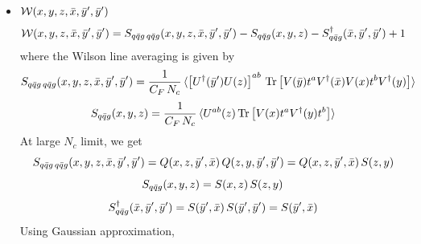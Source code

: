 \documentclass[9pt]{article}
\numberwithin{equation}{section}
\begin{document}
\begin{itemize}
\begin{align}
        \mathcal{W}(x',y,x',\Bar{x},\Bar{y},\Bar{z}) & = S_{q\Bar{q}g\,q\Bar{q}g}(x',y,x',\Bar{x},\Bar{y},\Bar{z}) -S_{q\Bar{q}g}(x',y,x') - S^{\dagger}_{q\Bar{q}g}(\Bar{x},\Bar{y},\Bar{z}) + 1
    \end{align}
where the Wilson line averaging is given by 
$$S_{q\Bar{q}g\,q\Bar{q}g}(x',y,x',\Bar{x},\Bar{y},\Bar{z}) =  \frac{1}{C_{F}\,N_{c}}\, \langle \left[U^{\dagger}(\Bar{z})U(x')\right]^{ab}\, \text{Tr}\left[V(\Bar{y})t^{a}V^{\dagger}(\Bar{x})V(x')t^{b}V^{\dagger}(y)\right] \rangle$$
$$S_{q\Bar{q}g}(x',y,x') =  \frac{1}{C_{F}\,N_{c}}\, \langle U^{ab}(x')\,\text{Tr}\left[V(x')t^{a}V^{\dagger}(y)t^{b}\right]\rangle$$
At large $N_{c}$ limit, we get
$$S_{q\Bar{q}g\,q\Bar{q}g}(x',y,x',\Bar{x},\Bar{y},\Bar{z}) = Q(x',x',\Bar{z},\Bar{x})\, Q(x',y,\Bar{y},\Bar{z}) = S(\Bar{z},\Bar{x})\,Q(x',y,\Bar{y},\Bar{z})$$
$$S_{q\Bar{q}g}(x',y,x') = S(x',x')\, S(x',y) = S(x',y) $$
$$S^{\dagger}_{q\Bar{q}g}(\Bar{x},\Bar{y},\Bar{z}) = S(\Bar{z},\Bar{x})\, S(\Bar{y},\Bar{z})$$
Using Gaussian approximation,
\begin{align}
    Q(x',y,\Bar{y},\Bar{z}) & = S(x',y)\,S(\Bar{y},\Bar{z}) - \frac{F(x',y;\Bar{y},\Bar{z})}{F(x',\Bar{y};y,\Bar{z})}\,\left[S(x',y)\,S(\Bar{y},\Bar{z})-S(x',\Bar{z})\,S(\Bar{y},y)\right]
\end{align}
\item $\mathcal{W}(x,y,z,\Bar{x},\Bar{y}',\Bar{y}')$
\begin{align}
        \mathcal{W}(x,y,z,\Bar{x},\Bar{y}',\Bar{y}') & = S_{q\Bar{q}g\,q\Bar{q}g}(x,y,z,\Bar{x},\Bar{y}',\Bar{y}') -S_{q\Bar{q}g}(x,y,z) - S^{\dagger}_{q\Bar{q}g}(\Bar{x},\Bar{y}',\Bar{y}') + 1
    \end{align}
where the Wilson line averaging is given by 
$$S_{q\Bar{q}g\,q\Bar{q}g}(x,y,z,\Bar{x},\Bar{y}',\Bar{y}') = \frac{1}{C_{F}\,N_{c}}\, \langle \left[U^{\dagger}(\Bar{y}')U(z)\right]^{ab}\, \text{Tr}\left[V(\Bar{y})t^{a}V^{\dagger}(\Bar{x})V(x)t^{b}V^{\dagger}(y)\right] \rangle$$
$$S_{q\Bar{q}g}(x,y,z) =  \frac{1}{C_{F}\,N_{c}}\, \langle U^{ab}(z)\,\text{Tr}\left[V(x)t^{a}V^{\dagger}(y)t^{b}\right]\rangle$$
At large $N_{c}$ limit, we get
$$S_{q\Bar{q}g\,q\Bar{q}g}(x,y,z,\Bar{x},\Bar{y}',\Bar{y}') = Q(x,z,\Bar{y}',\Bar{x})\, Q(z,y,\Bar{y}',\Bar{y}') = Q(x,z,\Bar{y}',\Bar{x})\, S(z,y) $$
$$S_{q\Bar{q}g}(x,y,z) = S(x,z)\, S(z,y)$$
$$S^{\dagger}_{q\Bar{q}g}(\Bar{x},\Bar{y}',\Bar{y}') = S(\Bar{y}',\Bar{x})\, S(\Bar{y}',\Bar{y}') = S(\Bar{y}',\Bar{x})$$
Using Gaussian approximation,
\begin{align}

\end{align}
\end{itemize}
\end{document}
